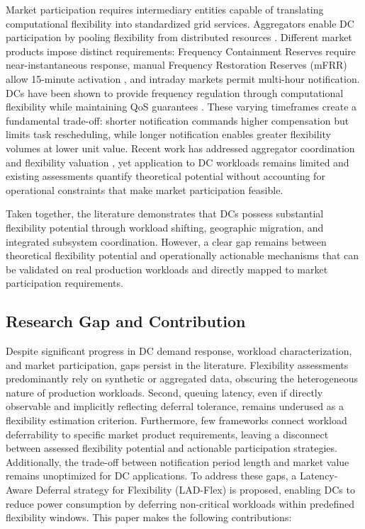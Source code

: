 \documentclass[preprint,12pt]{elsarticle}
\begin{document}
Market participation requires intermediary entities capable of translating computational flexibility into standardized grid services. Aggregators enable DC participation by pooling flexibility from distributed resources \cite{Olivella-Rosell2018, Kerscher2022, Iria2019, Lu2020}. Different market products impose distinct requirements: Frequency Containment Reserves require near-instantaneous response, manual Frequency Restoration Reserves (mFRR) allow 15-minute activation \cite{entsoe_balancing}, and intraday markets permit multi-hour notification. DCs have been shown to provide frequency regulation through computational flexibility while maintaining QoS guarantees \cite{Wang2019}. These varying timeframes create a fundamental trade-off: shorter notification commands higher compensation but limits task rescheduling, while longer notification enables greater flexibility volumes at lower unit value. Recent work has addressed aggregator coordination and flexibility valuation \cite{Iria2019, Rasouli2023}, yet application to DC workloads remains limited and existing assessments quantify theoretical potential without accounting for operational constraints that make market participation feasible.

Taken together, the literature demonstrates that DCs possess substantial flexibility potential through workload shifting, geographic migration, and integrated subsystem coordination. However, a clear gap remains between theoretical flexibility potential and operationally actionable mechanisms that can be validated on real production workloads and directly mapped to market participation requirements.





\subsection{Research Gap and Contribution}
\label{sec:research_gap}

Despite significant progress in DC demand response, workload characterization, and market participation, gaps persist in the literature. Flexibility assessments predominantly rely on synthetic or aggregated data, obscuring the heterogeneous nature of production workloads. Second, queuing latency, even if directly observable and implicitly reflecting deferral tolerance, remains underused as a flexibility estimation criterion. Furthermore, few frameworks connect workload deferrability to specific market product requirements, leaving a disconnect between assessed flexibility potential and actionable participation strategies. Additionally, the trade-off between notification period length and market value remains unoptimized for DC applications. To address these gaps, a Latency-Aware Deferral strategy for Flexibility (LAD-Flex) is proposed, enabling DCs to reduce power consumption by deferring non-critical workloads within predefined flexibility windows. This paper makes the following contributions:
\end{document}
